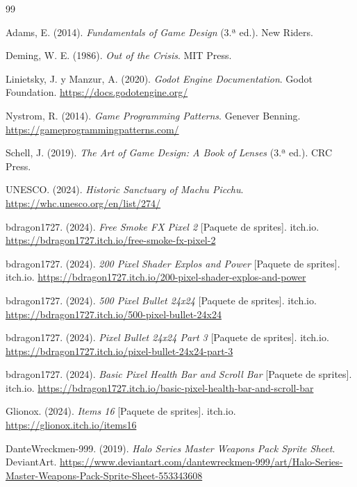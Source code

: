 \documentclass[12pt, a4paper, oneside]{report}
\begin{document}
\begin{thebibliography}{99}

Adams, E. (2014). \textit{Fundamentals of Game Design} (3.ª ed.).
New Riders.

Deming, W. E. (1986). \textit{Out of the Crisis}. MIT Press.

Linietsky, J. y Manzur, A. (2020). \textit{Godot Engine Documentation}.
Godot Foundation. \url{https://docs.godotengine.org/}

Nystrom, R. (2014). \textit{Game Programming Patterns}. Genever Benning.
\url{https://gameprogrammingpatterns.com/}

Schell, J. (2019). \textit{The Art of Game Design: A Book of Lenses} (3.ª ed.).
CRC Press.

UNESCO. (2024). \textit{Historic Sanctuary of Machu Picchu}.
\url{https://whc.unesco.org/en/list/274/}

bdragon1727. (2024). \textit{Free Smoke FX Pixel 2} [Paquete de sprites].
itch.io. \url{https://bdragon1727.itch.io/free-smoke-fx-pixel-2}

bdragon1727. (2024). \textit{200 Pixel Shader Explos and Power} [Paquete de sprites].
itch.io. \url{https://bdragon1727.itch.io/200-pixel-shader-explos-and-power}

bdragon1727. (2024). \textit{500 Pixel Bullet 24x24} [Paquete de sprites].
itch.io. \url{https://bdragon1727.itch.io/500-pixel-bullet-24x24}

bdragon1727. (2024). \textit{Pixel Bullet 24x24 Part 3} [Paquete de sprites].
itch.io. \url{https://bdragon1727.itch.io/pixel-bullet-24x24-part-3}

bdragon1727. (2024). \textit{Basic Pixel Health Bar and Scroll Bar} [Paquete de sprites].
itch.io. \url{https://bdragon1727.itch.io/basic-pixel-health-bar-and-scroll-bar}

Glionox. (2024). \textit{Items 16} [Paquete de sprites].
itch.io. \url{https://glionox.itch.io/items16}

DanteWreckmen-999. (2019). \textit{Halo Series Master Weapons Pack Sprite Sheet}.
DeviantArt. \url{https://www.deviantart.com/dantewreckmen-999/art/Halo-Series-Master-Weapons-Pack-Sprite-Sheet-553343608}

\end{thebibliography}
\end{document}
